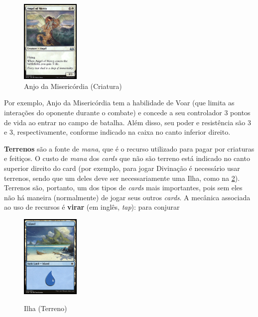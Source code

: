 \documentclass{book}
\begin{document}
\begin{figure}
\centering
    \includegraphics[width=0.25\textwidth]{picstcc/angelOfMercy.jpg}
    \caption{Anjo da Misericórdia (Criatura)}
    \label{anjo}
\end{figure}

Por exemplo, Anjo da Misericórdia tem a habilidade de Voar (que limita
as interações do oponente durante o combate) e concede a seu controlador
3 pontos de vida ao entrar no campo de batalha. Além disso, seu poder e
resistência são 3 e 3, respectivamente, conforme indicado na caixa no
canto inferior direito.

\textbf{Terrenos} são a fonte de \textit{mana}, que é o recurso
utilizado para pagar por criaturas e feitiços. O custo de \textit{mana}
dos \textit{cards} que não são terreno está indicado no canto superior
direito do card (por exemplo, para jogar Divinação é necessário usar
terrenos, sendo que um deles deve ser necessariamente uma Ilha, como na
\ref{ilha}). Terrenos são, portanto, um dos tipos de \textit{cards}
mais importantes, pois sem eles não há maneira (normalmente) de jogar
seus outros \textit{cards}. A mecânica associada ao uso de recursos é
\textbf{virar} (em inglês, \textit{tap}): para conjurar

\begin{figure}
    \centering
    \includegraphics[width=0.25\textwidth]{picstcc/island.jpg}
    \label{ilha}
    \caption{Ilha (Terreno)}
\end{figure}
\end{document}
